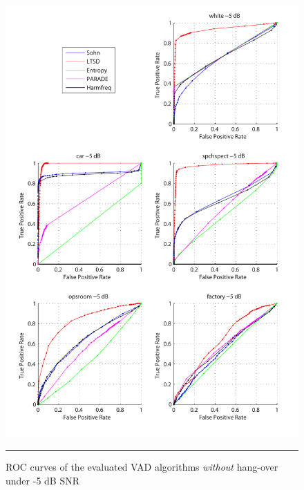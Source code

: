 \begin{figure}[htbp]
	\centering
		\includegraphics[width=1.0\columnwidth]{Figures/Chapter3/-5dBnoh.pdf}
		\rule{37em}{0.5pt}
	\caption[ROC curves of the evaluated algorithms \emph{without} hang-over under -5 dB SNR]{ROC curves of the evaluated VAD algorithms \emph{without} hang-over under -5 dB SNR}
	\label{fig:-5dBnoh}
\end{figure}

